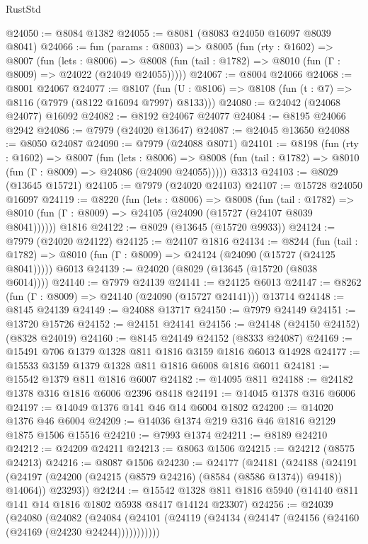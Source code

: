 \begin{lexlean}{RustStd}
\begin{coremodule}
@24050 := @8084 @1382
@24055 := @8081 (@8083 @24050 @16097 @8039 @8041)
@24066 := fun (params : @8003) =>
  @8005
    (fun (rty : @1602) =>
    @8007
      (fun (lets : @8006) =>
      @8008 (fun (tail : @1782) => @8010 (fun (Γ : @8009) => @24022 (@24049 @24055)))))
@24067 := @8004 @24066
@24068 := @8001 @24067
@24077 := @8107
    (fun (U : @8106) => @8108 (fun (t : @7) => @8116 (@7979 (@8122 @16094 @7997) @8133)))
@24080 := @24042 (@24068 @24077) @16092
@24082 := @8192 @24067 @24077
@24084 := @8195 @24066 @2942
@24086 := @7979 (@24020 @13647)
@24087 := @24045 @13650
@24088 := @8050 @24087
@24090 := @7979 (@24088 @8071)
@24101 := @8198
    (fun (rty : @1602) =>
    @8007
      (fun (lets : @8006) =>
      @8008 (fun (tail : @1782) => @8010 (fun (Γ : @8009) => @24086 (@24090 @24055)))))
    @3313
@24103 := @8029 (@13645 @15721)
@24105 := @7979 (@24020 @24103)
@24107 := @15728 @24050 @16097
@24119 := @8220
    (fun (lets : @8006) =>
    @8008
      (fun (tail : @1782) =>
      @8010 (fun (Γ : @8009) => @24105 (@24090 (@15727 (@24107 @8039 @8041))))))
    @1816
@24122 := @8029 (@13645 (@15720 @9933))
@24124 := @7979 (@24020 @24122)
@24125 := @24107 @1816
@24134 := @8244
    (fun (tail : @1782) => @8010 (fun (Γ : @8009) => @24124 (@24090 (@15727 (@24125 @8041)))))
    @6013
@24139 := @24020 (@8029 (@13645 (@15720 (@8038 @6014))))
@24140 := @7979 @24139
@24141 := @24125 @6013
@24147 := @8262 (fun (Γ : @8009) => @24140 (@24090 (@15727 @24141))) @13714
@24148 := @8145 @24139
@24149 := @24088 @13717
@24150 := @7979 @24149
@24151 := @13720 @15726
@24152 := @24151 @24141
@24156 := @24148 (@24150 @24152) (@8328 @24019)
@24160 := @8145 @24149 @24152 (@8333 @24087)
@24169 := @15491 @706 @1379 @1328 @811 @1816 @3159 @1816 @6013 @14928
@24177 := @15533 @3159 @1379 @1328 @811 @1816 @6008 @1816 @6011
@24181 := @15542 @1379 @811 @1816 @6007
@24182 := @14095 @811
@24188 := @24182 @1378 @316 @1816 @6006 @2396 @8418
@24191 := @14045 @1378 @316 @6006
@24197 := @14049 @1376 @141 @46 @14 @6004 @1802
@24200 := @14020 @1376 @46 @6004
@24209 := @14036 @1374 @219 @316 @46 @1816 @2129 @1875 @1506 @15516
@24210 := @7993 @1374
@24211 := @8189 @24210
@24212 := @24209 @24211
@24213 := @8063 @1506
@24215 := @24212 (@8575 @24213)
@24216 := @8087 @1506
@24230 := @24177
    (@24181
      (@24188
        (@24191 (@24197 (@24200 (@24215 (@8579 @24216) (@8584 (@8586 @1374)) @9418)) @14064))
        @23293))
@24244 := @15542 @1328 @811 @1816 @5940 (@14140 @811 @141 @14 @1816 @1802 @5938 @8417 @14124 @23307)
@24256 := @24039
    (@24080
      (@24082
        (@24084 (@24101 (@24119 (@24134 (@24147 (@24156 (@24160 (@24169 (@24230 @24244)))))))))))

\end{coremodule}
\end{lexlean}
